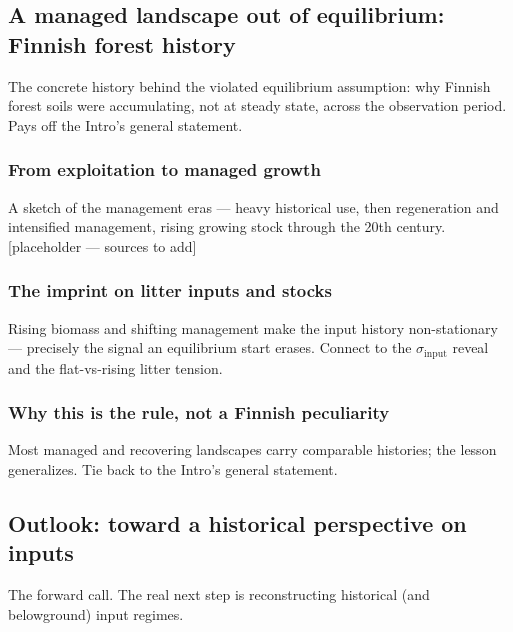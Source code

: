 \documentclass[11pt]{article}
\begin{document}
\subsection{A managed landscape out of equilibrium: Finnish forest history}
The concrete history behind the violated equilibrium assumption: why Finnish
forest soils were accumulating, not at steady state, across the observation
period. Pays off the Intro's general statement.

\subsubsection{From exploitation to managed growth}
A sketch of the management eras --- heavy historical use, then regeneration and
intensified management, rising growing stock through the 20th century.
[placeholder --- sources to add]

\subsubsection{The imprint on litter inputs and stocks}
Rising biomass and shifting management make the input history non-stationary
--- precisely the signal an equilibrium start erases. Connect to the
$\sigma_{\mathrm{input}}$ reveal and the flat-vs-rising litter tension.

\subsubsection{Why this is the rule, not a Finnish peculiarity}
Most managed and recovering landscapes carry comparable histories; the lesson
generalizes. Tie back to the Intro's general statement.

\subsection{Outlook: toward a historical perspective on inputs}
The forward call. The real next step is reconstructing historical (and
belowground) input regimes.
\end{document}
